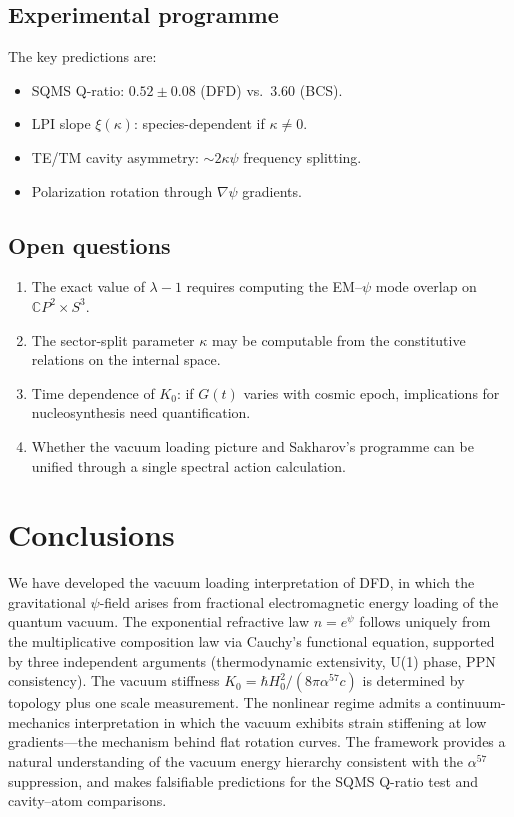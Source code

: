 \documentclass[aps,prd,twocolumn,superscriptaddress,nofootinbib]{revtex4-2}
\newcommand{\CP}{\mathbb{C}P}
\begin{document}
\subsection{Experimental programme}

The key predictions are:
\begin{itemize}
\item SQMS Q-ratio: $0.52 \pm 0.08$ (DFD) vs.\ $3.60$ (BCS).
\item LPI slope $\xi(\kappa)$: species-dependent if $\kappa \neq 0$.
\item TE/TM cavity asymmetry: $\sim 2\kappa\psi$ frequency splitting.
\item Polarization rotation through $\nabla\psi$ gradients.
\end{itemize}

\subsection{Open questions}

\begin{enumerate}
\item The exact value of $\lambda - 1$ requires computing the
EM--$\psi$ mode overlap on $\CP^2 \times S^3$.
\item The sector-split parameter $\kappa$ may be computable from the
constitutive relations on the internal space.
\item Time dependence of $K_0$: if $G(t)$ varies with cosmic epoch,
implications for nucleosynthesis need quantification.
\item Whether the vacuum loading picture and Sakharov's programme can
be unified through a single spectral action calculation.
\end{enumerate}


\section{Conclusions}
\label{sec:conclusions}

We have developed the vacuum loading interpretation of DFD, in which
the gravitational $\psi$-field arises from fractional electromagnetic
energy loading of the quantum vacuum.  The exponential refractive law
$n = e^\psi$ follows uniquely from the multiplicative composition law
via Cauchy's functional equation, supported by three independent
arguments (thermodynamic extensivity, U(1) phase, PPN consistency).
The vacuum stiffness $K_0 = \hbar H_0^2/(8\pi\alpha^{57}c)$ is
determined by topology plus one scale measurement.  The nonlinear
regime admits a continuum-mechanics interpretation in which the vacuum
exhibits strain stiffening at low gradients---the mechanism behind
flat rotation curves.  The framework provides a natural understanding
of the vacuum energy hierarchy consistent with the $\alpha^{57}$
suppression, and makes falsifiable predictions for the SQMS Q-ratio
test and cavity--atom comparisons.
\end{document}
